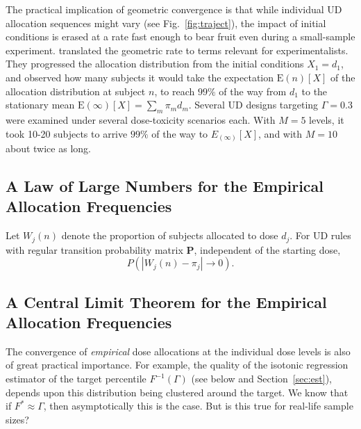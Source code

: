 The practical implication of geometric convergence is that while individual UD allocation sequences might vary (see Fig.~\ref{fig:traject}), the impact of initial conditions is erased at a rate fast enough to bear fruit even during a small-sample experiment. \cite{Oron:Hoff:thek:2009} translated the geometric rate to terms relevant for experimentalists. They progressed the allocation distribution from the initial conditions $X_1=d_1$, and observed how many subjects it would take the expectation $\mathrm{E}{(n)}[X]$ of the allocation distribution at subject $n$,  to reach $99\%$ of the way from $d_1$ to the stationary mean $\mathrm{E}{(\infty)}[X]=\sum_m \pi_m d_m$. Several UD designs targeting $\Gamma=0.3$ were examined under several dose-toxicity scenarios each. With $M=5$ levels, it took 10-20 subjects to arrive $99\%$ of the way to $E_{(\infty)}[X]$, and with $M=10$ about twice as long.

\subsection{A Law of Large Numbers for the Empirical Allocation Frequencies}
Let $W_j(n)$ denote the proportion of subjects allocated to dose $d_j$.  For UD rules with regular transition probability matrix $\mathbf P$, independent of the starting dose, $$P\left(|W_j(n)-\pi_j|\longrightarrow 0\right). $$

\subsection{A Central Limit Theorem for the Empirical Allocation Frequencies}\label{sec:asymvar}

The convergence of \emph{empirical} dose allocations at the individual dose levels is also of great practical importance. For example, the quality of the isotonic regression estimator of the target percentile $F^{-1}(\Gamma)$ (see below and Section~\ref{sec:est}), depends upon this distribution being clustered around the target. We know that if $F^*\approx\Gamma$, then asymptotically this is the case. But is this true for real-life sample sizes?



